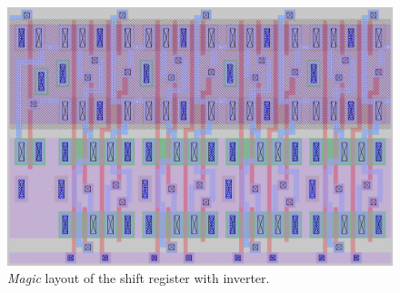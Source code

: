 \documentclass[11pt]{article}
\begin{document}
    \begin{figure}[!ht]
        \centering
        \includegraphics[width=0.8\linewidth]{../img/sreg_mag.png}
        \caption{\textit{Magic} layout of the shift register with inverter.}
        \label{fig:sregmag_inv}
    \end{figure}
    \FloatBarrier
\end{document}
